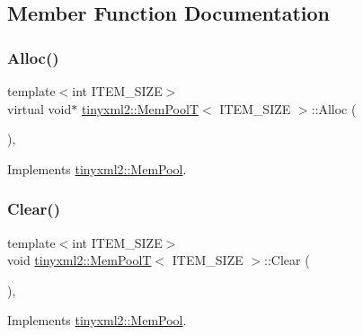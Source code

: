 \subsection{Member Function Documentation}
\mbox{\label{classtinyxml2_1_1_mem_pool_t_a810fd2b0caf56b8b688e55f2768f96c7}} 
\subsubsection{\texorpdfstring{Alloc()}{Alloc()}}
{\footnotesize\ttfamily template$<$int I\+T\+E\+M\+\_\+\+S\+I\+ZE$>$ \\
virtual void$\ast$ \hyperlink{classtinyxml2_1_1_mem_pool_t}{tinyxml2\+::\+Mem\+PoolT}$<$ I\+T\+E\+M\+\_\+\+S\+I\+ZE $>$\+::Alloc (\begin{DoxyParamCaption}{ }\end{DoxyParamCaption})\hspace{0.3cm}{\ttfamily [inline]}, {\ttfamily [virtual]}}



Implements \hyperlink{classtinyxml2_1_1_mem_pool_a4f977b5fed752c0bbfe5295f469d6449}{tinyxml2\+::\+Mem\+Pool}.

\mbox{\label{classtinyxml2_1_1_mem_pool_t_a22d595caa0e9d23aa080f49ca6475fdd}} 
\subsubsection{\texorpdfstring{Clear()}{Clear()}}
{\footnotesize\ttfamily template$<$int I\+T\+E\+M\+\_\+\+S\+I\+ZE$>$ \\
void \hyperlink{classtinyxml2_1_1_mem_pool_t}{tinyxml2\+::\+Mem\+PoolT}$<$ I\+T\+E\+M\+\_\+\+S\+I\+ZE $>$\+::Clear (\begin{DoxyParamCaption}{ }\end{DoxyParamCaption})\hspace{0.3cm}{\ttfamily [inline]}, {\ttfamily [virtual]}}



Implements \hyperlink{classtinyxml2_1_1_mem_pool_a74fcdef9756917c8ae19fbbb4d658ed7}{tinyxml2\+::\+Mem\+Pool}.

